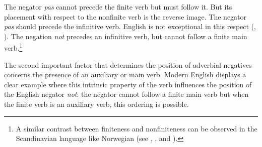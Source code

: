 \documentclass[output=paper]{langsci/langscibook}
\begin{document}
\noindent
The negator {\it pas} cannot precede the finite verb
but must follow it. But its placement with respect to
the nonfinite verb is the reverse image. The negator {\it pas}
should precede the infinitive verb.
English is not exceptional in this respect (\citet{Baker:89,Baker:91}, \citet{Ernst:92}).
The negation {\it not} precedes an infinitive verb, but cannot follow
a finite main verb.\footnote{A similar contrast between finiteness and
nonfiniteness can be observed in the Scandinavian language like Norwegian (see \citet{Platzack:86}, \citet{HP:88}, and \citet{Vikner:94,Vikner:97}).}

\begin{exe}
\ex \begin{xlist}
\end{xlist}
\end{exe}

\begin{exe}
\ex\label{eng-fin-neg} \begin{xlist}
\end{xlist}
\end{exe}

\pfix
\pfix\pfix

\begin{exe}
\ex\label{fr-fin-neg} \begin{xlist}
\end{xlist}
\end{exe}



%
%
%
%
%

The second important factor that determines the position of adverbial
negatives concerns the presence of an auxiliary or main verb.
Modern English displays a clear example where this
intrinsic property of the verb influences the position of
the English negator {\it not}: the negator cannot follow
a finite main verb but when the finite verb is an auxiliary verb,
this ordering is possible.
\end{document}
